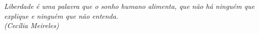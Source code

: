 \begin{epigrafe}
    \vspace*{\fill}
    \begin{flushright}
		\textit{
            Liberdade é uma palavra que o sonho humano alimenta, que não há
            ninguém que explique e ninguém que não entenda. \\
            (Cecília Meireles)
        }
    \end{flushright}
\end{epigrafe}
